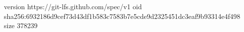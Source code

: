 version https://git-lfs.github.com/spec/v1
oid sha256:6932186d9cef73d43df1b583c7583b7e5cde9d2325451dc3eaf9b93314e4f498
size 378239
